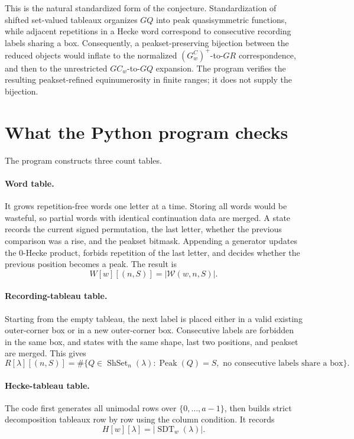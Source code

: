\documentclass{article}
\newcommand{\Peak}{\operatorname{Peak}}
\newcommand{\ShSet}{\operatorname{ShSet}}
\newcommand{\SDT}{\operatorname{SDT}}
\begin{document}
This is the natural standardized form of the conjecture.  Standardization of
shifted set-valued tableaux organizes \(GQ\) into peak quasisymmetric
functions, while adjacent repetitions in a Hecke word correspond to
consecutive recording labels sharing a box.  Consequently, a
peakset-preserving bijection between the reduced objects would inflate to the
normalized \((G_w^C)^+\)-to-\(GR\) correspondence, and then to the unrestricted
\(GC_w\)-to-\(GQ\) expansion.  The program verifies the resulting
peakset-refined equinumerosity in finite ranges; it does not supply the
bijection.

\section{What the Python program checks}

The program constructs three count tables.

\paragraph{Word table.}
It grows repetition-free words one letter at a time.  Storing all words would
be wasteful, so partial words with identical continuation data are merged.
A state records the current signed permutation, the last letter, whether the
previous comparison was a rise, and the peakset bitmask.  Appending a generator updates the \(0\)-Hecke product,
forbids repetition of the last letter, and decides whether the previous
position becomes a peak.  The result is
\[
  W[w][(n,S)]=|\mathcal W(w,n,S)|.
\]

\paragraph{Recording-tableau table.}
Starting from the empty tableau, the next label is placed either in a valid
existing outer-corner box or in a new outer-corner box.  Consecutive labels
are forbidden in the same box, and states with the same shape, last two
positions, and peakset are merged.  This gives
\[
  R[\lambda][(n,S)]
  =\#\{Q\in\ShSet_n(\lambda):\Peak(Q)=S,
            \text{ no consecutive labels share a box}\}.
\]

\paragraph{Hecke-tableau table.}
The code first generates all unimodal rows over \(\{0,\ldots,a-1\}\), then
builds strict decomposition tableaux row by row using the column condition.
It records
\[
  H[w][\lambda]=|\SDT_w(\lambda)|.
\]
\end{document}
